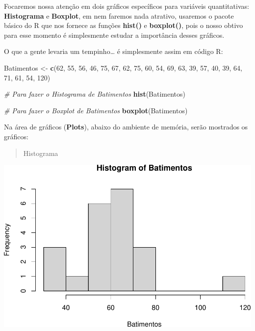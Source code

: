 \documentclass[
]{book}
\newenvironment{Shaded}{\begin{snugshade}}{\end{snugshade}}
\newcommand{\CommentTok}[1]{\textcolor[rgb]{0.56,0.35,0.01}{\textit{#1}}}
\newcommand{\DecValTok}[1]{\textcolor[rgb]{0.00,0.00,0.81}{#1}}
\newcommand{\FunctionTok}[1]{\textcolor[rgb]{0.13,0.29,0.53}{\textbf{#1}}}
\newcommand{\NormalTok}[1]{#1}
\newcommand{\OtherTok}[1]{\textcolor[rgb]{0.56,0.35,0.01}{#1}}
\begin{document}
Focaremos nossa atenção em dois gráficos específicos para variáveis quantitativas: \textbf{Histograma} e \textbf{Boxplot}, em nem faremos nada atrativo, usaremos o pacote básico do R que nos fornece as funções \textbf{hist()} e \textbf{boxplot()}, pois o nosso obtivo para esse momento é simplesmente estudar a importância desses gráficos.

O que a gente levaria um tempinho\ldots{} é simplesmente assim em código R:

\begin{Shaded}
\begin{Highlighting}[]
\NormalTok{Batimentos }\OtherTok{\textless{}{-}} \FunctionTok{c}\NormalTok{(}\DecValTok{62}\NormalTok{, }\DecValTok{55}\NormalTok{, }\DecValTok{56}\NormalTok{, }\DecValTok{46}\NormalTok{, }\DecValTok{75}\NormalTok{, }\DecValTok{67}\NormalTok{, }\DecValTok{62}\NormalTok{, }\DecValTok{75}\NormalTok{, }\DecValTok{60}\NormalTok{, }\DecValTok{54}\NormalTok{, }\DecValTok{69}\NormalTok{, }\DecValTok{63}\NormalTok{, }\DecValTok{39}\NormalTok{, }\DecValTok{57}\NormalTok{, }\DecValTok{40}\NormalTok{, }\DecValTok{39}\NormalTok{, }\DecValTok{64}\NormalTok{, }\DecValTok{71}\NormalTok{, }\DecValTok{61}\NormalTok{, }\DecValTok{54}\NormalTok{, }\DecValTok{120}\NormalTok{)}

\CommentTok{\# Para fazer o Histograma de Batimentos}
\FunctionTok{hist}\NormalTok{(Batimentos)}

\CommentTok{\# Para fazer o Boxplot de Batimentos}
\FunctionTok{boxplot}\NormalTok{(Batimentos)}
\end{Highlighting}
\end{Shaded}

Na área de gráficos (\textbf{Plots}), abaixo do ambiente de memória, serão mostrados os gráficos:

\begin{quote}
Histograma
\end{quote}

\includegraphics{Livro-Estatistica+R_files/figure-latex/unnamed-chunk-14-1.pdf}
\end{document}
